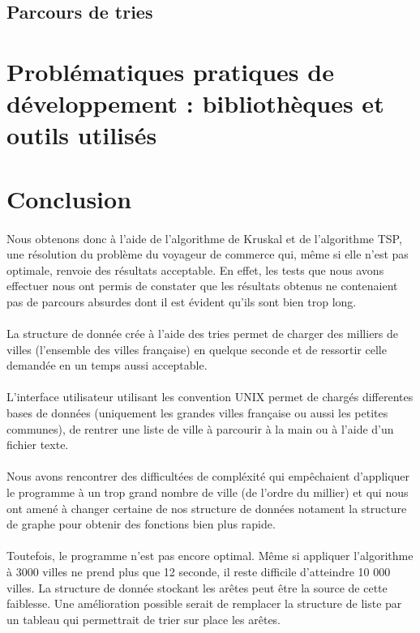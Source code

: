 \documentclass[a4paper]{article}
\begin{document}
\subsection{Parcours de tries}

\section{Problématiques pratiques de développement : bibliothèques et outils utilisés}


\section*{Conclusion}
\paragraph*{}
Nous obtenons donc à l'aide de l'algorithme de Kruskal et de l'algorithme TSP, une résolution du problème du voyageur de commerce qui, même si elle n'est pas optimale, renvoie des résultats acceptable. En effet, les tests que nous avons effectuer nous ont permis de constater que les résultats obtenus ne contenaient pas de parcours absurdes dont il est évident qu'ils sont bien trop long.
\paragraph*{}
La structure de donnée crée à l'aide des tries permet de charger des milliers de villes (l'ensemble des villes française) en quelque seconde et de ressortir celle demandée en un temps aussi acceptable.
\paragraph*{}
L'interface utilisateur utilisant les convention UNIX permet de chargés differentes bases de données (uniquement les grandes villes française ou aussi les petites communes), de rentrer une liste de ville à parcourir à la main ou à l'aide d'un fichier texte.
\paragraph*{}
Nous avons rencontrer des difficultées de compléxité qui empêchaient d'appliquer le programme à un trop grand nombre de ville (de l'ordre du millier) et qui nous ont amené à changer certaine de nos structure de données notament la structure de graphe pour obtenir des fonctions bien plus rapide.
\paragraph*{}
Toutefois, le programme n'est pas encore optimal. Même si appliquer l'algorithme à 3000 villes ne prend plus que 12 seconde, il reste difficile d'atteindre 10 000 villes. La structure de donnée stockant les arêtes peut être la source de cette faiblesse. Une amélioration possible serait de remplacer la structure de liste par un tableau qui permettrait de trier sur place les arêtes.
\end{document}

